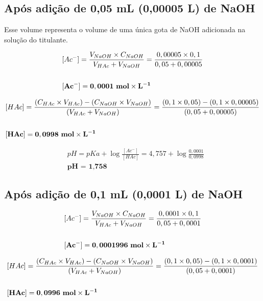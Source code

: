 \documentclass[a4paper, 12pt]{article}
\begin{document}
\subsection{Após adição de 0,05 mL (0,00005 L) de NaOH}
Esse volume representa o volume de uma única gota de NaOH adicionada na solução do titulante.

\begin{fleqn}
\begin{align*}
	& [Ac^{-}] = \frac{ V_{NaOH} \times C_{NaOH} }{ V_{HAc} + V_{NaOH} } = \frac{0,00005 \times 0,1}{0,05 + 0,00005} \\ \\
	& \mathbf{[Ac^{-}] = 0,0001 \text{ \textbf{mol}} \times L^{-1}}
\end{align*}
\end{fleqn}

\begin{fleqn}
\begin{align*}
	& [HAc] = \frac{ (C_{HAc} \times V_{HAc}) - (C_{NaOH} \times V_{NaOH}) }{ (V_{HAc} + V_{NaOH}) } = \frac{ (0,1 \times 0,05) - (0,1 \times 0,00005) }{ (0,05 + 0,00005) }\\ \\
	& \mathbf{[HAc] = 0,0998 \text{ \textbf{mol}} \times L^{-1}}
\end{align*}
\end{fleqn}

\begin{fleqn}
\begin{align*}
 	& pH = pKa + \log \frac{[Ac^{-}]}{[HAc]} = 4,757 + \log \frac{0,0001}{0,0998} \\
	& \textbf{pH = 1,758}
\end{align*}
\end{fleqn}

\subsection{Após adição de 0,1 mL (0,0001 L) de NaOH}
\begin{fleqn}
	\begin{align*}
		& [Ac^{-}] = \frac{ V_{NaOH} \times C_{NaOH} }{ V_{HAc} + V_{NaOH} } = \frac{0,0001 \times 0,1}{0,05 + 0,0001} \\ \\
		& \mathbf{[Ac^{-}] = 0,0001996 \text{ \textbf{mol}} \times L^{-1}}
	\end{align*}
\end{fleqn}

\begin{fleqn}
	\begin{align*}
		& [HAc] = \frac{ (C_{HAc} \times V_{HAc}) - (C_{NaOH} \times V_{NaOH}) }{ (V_{HAc} + V_{NaOH}) } = \frac{ (0,1 \times 0,05) - (0,1 \times 0,0001) }{ (0,05 + 0,0001) }\\ \\
		& \mathbf{[HAc] = 0,0996 \text{ \textbf{mol}} \times L^{-1}}
	\end{align*}
\end{fleqn}
\end{document}
